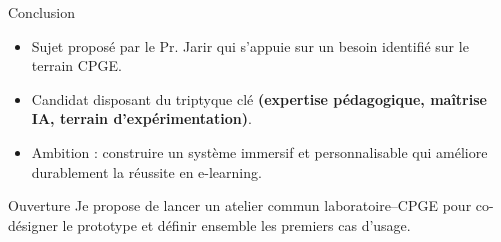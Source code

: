 \documentclass[aspectratio=169]{beamer}
\begin{document}
\begin{frame}{Conclusion}
  \begin{itemize}
    \item Sujet proposé par le Pr. Jarir qui s'appuie sur un besoin identifié sur le terrain CPGE.
    \item Candidat disposant du triptyque clé \textbf{(expertise pédagogique, maîtrise IA, terrain d'expérimentation)}.
    \item Ambition : construire un système immersif et personnalisable qui améliore durablement la réussite en e-learning.
  \end{itemize}
  \vfill
  \begin{block}{Ouverture}
    Je propose de lancer un atelier commun laboratoire--CPGE pour co-désigner le prototype et définir ensemble les premiers cas d'usage.
  \end{block}
\end{frame}
\end{document}
